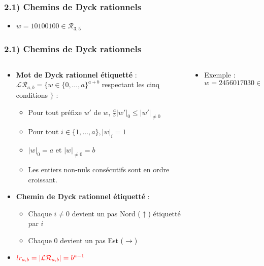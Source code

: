 \documentclass{beamer}
\begin{document}
\begin{frame}
    \frametitle{2.1) Chemins de Dyck rationnels}
    \begin{itemize}
        \item $w = 10100100 \in \mathcal{R}_{3,5}$
    \end{itemize}
    
\end{frame}

\begin{frame}
    \frametitle{2.1) Chemins de Dyck rationnels}
    \begin{columns}
        \begin{column}{0.7\textwidth}
            \begin{itemize}
                \item \textbf{Mot de Dyck rationnel étiquetté} : 
                $\mathcal{LR}_{a,b} = 
                    \{w \in \{0,\ldots, a\}^{a+b}$ respectant les 
                    cinq conditions $\}$ :
                \begin{itemize}
                    \item Pour tout préfixe $w'$ de $w$, $\frac{a}{b}|w'|_0
                        \leqslant |w'|_{\neq 0}$
                    \item Pour tout $i \in \{1, \ldots, a\}, |w|_i = 1$
                    \item $|w|_0 = a$ et $|w|_{\neq 0} = b$
                    \item Les entiers non-nuls consécutifs sont en ordre
                        croissant.
                \end{itemize}
                \item \textbf{Chemin de Dyck rationnel étiquetté} :
                \begin{itemize}
                    \item Chaque $i \neq 0$ devient un pas Nord ($\uparrow$)
                        étiquetté par $i$
                    \item Chaque 0 devient un pas Est ($\rightarrow$)
                \end{itemize}
                \item $\color{red}{\displaystyle lr_{a,b} =
                    |\mathcal{LR}_{a,b}| = b^{a-1}}$
            \end{itemize}
        \end{column}
        \begin{column}{0.3\textwidth} 
                \begin{itemize}
                    \item Exemple : $w = 2456017030 \in \mathcal{LR}_{7,3}$
                \end{itemize}
                
        \end{column}
    \end{columns}
\end{frame}
\end{document}
